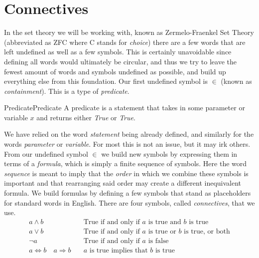 \section{Connectives}
    In the set theory we will be working with, known as
    Zermelo-Fraenkel Set Theory (abbreviated as ZFC where C stands for
    \textit{choice}) there are a few words that are left undefined as well as a
    few symbols. This is certainly unavoidable since defining all words would
    ultimately be circular, and thus we try to leave the fewest amount of words
    and symbols undefined as possible, and build up everything else from this
    foundation. Our first undefined symbol is $\in$ (known as
    \textit{containment}). This is a type of
    \textit{\gls{predicate}}.
    \begin{fdefinition}{Predicate}{Predicate}
        A \gls{predicate} is a statement that takes in some parameter or
        variable $x$ and returns either \textit{True} or \textit{True}.
    \end{fdefinition}
    We have relied on the word \textit{statement} being already defined, and
    similarly for the words \textit{parameter} or \textit{variable}. For most
    this is not an issue, but it may irk others. From our undefined symbol $\in$
    we build new symbols by expressing them in terms of a
    \textit{formula}, which is simply a finite
    sequence of symbols. Here the word \textit{sequence} is meant to imply that
    the \textit{order} in which we combine these symbols is important and that
    rearranging said order may create a different inequivalent formula. We build
    formulas by defining a few symbols that stand as placeholders for standard
    words in English. There are four symbols, called
    \textit{\glspl{connective}}, that we use.
    \begin{align*}
        a\land{b}\quad
        &\textrm{True if and only if }a
        \textrm{ is true and }b\textrm{ is true}
        \tag{Conjunction}\\
        a\lor{b}\quad
        &\textrm{True if and only if }a
        \textrm{ is true or }b\textrm{ is true, or both}
        \tag{Disjunction}\\
        \neg{a}\quad
        &\textrm{True if and only if }a\textrm{ is false}
        \tag{Negation}\\
        a\Leftrightarrow{b}\quad
        a\Rightarrow{b}\quad
        &a\textrm{ is true implies that }b\textrm{ is true}
        \tag{Implication}
    \end{align*}
